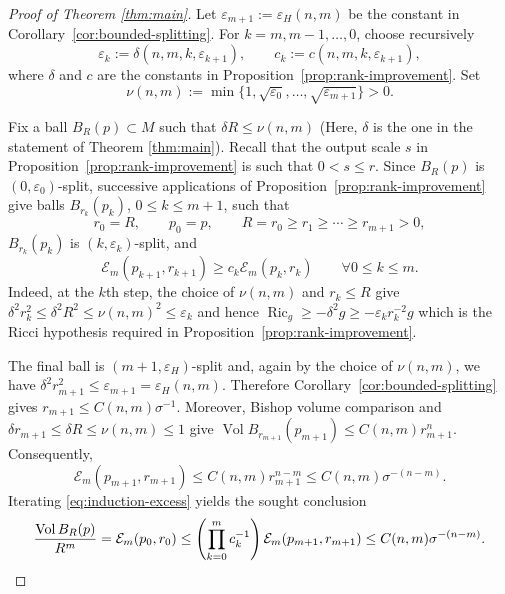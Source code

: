 \documentclass[11pt]{amsart}
\theoremstyle{definition}
\theoremstyle{remark}
\newtheorem{remark}[theorem]{Remark}
\DeclareMathOperator{\Ric}{Ric}
\DeclareMathOperator{\Vol}{Vol}
\newcommand{\R}{\mathbb R}
\newcommand{\eps}{\varepsilon}
\newcommand{\Cint}{\mathcal C}
\newcommand{\Ex}{\mathcal E}
\begin{document}
\begin{proof}[Proof of Theorem \ref{thm:main}]
Let $\eps_{m+1}:=\eps_H(n,m)$ be the constant in
Corollary~\ref{cor:bounded-splitting}. For
$k=m,m-1,\ldots,0$, choose recursively
\[
 \eps_k:=\delta(n,m,k,\eps_{k+1}),
 \qquad
 c_k:=c(n,m,k,\eps_{k+1}),
\]
where $\delta$ and $c$ are the constants in
Proposition~\ref{prop:rank-improvement}. Set
\[
 \nu(n,m):=\min\{1,\sqrt{\eps_0},\ldots,\sqrt{\eps_{m+1}}\}>0.
\]

Fix a ball $B_R(p)\subset M$ such that $\delta R\leq\nu(n,m)$ (Here, $\delta$ is the one in the statement of Theorem \ref{thm:main}).
Recall that the output scale $s$ in
Proposition~\ref{prop:rank-improvement} is such that $0<s\leq r$. Since $B_R(p)$ is
$(0,\eps_0)$-split, successive applications of Proposition~\ref{prop:rank-improvement} give
balls $B_{r_k}(p_k)$, $0\leq k\leq m+1$, such that
\[
 r_0=R,\qquad p_0=p,
 \qquad
 R=r_0\geq r_1\geq\cdots\geq r_{m+1}>0,
\]
$B_{r_k}(p_k)$ is $(k,\eps_k)$-split, and
\begin{equation}\label{eq:induction-excess}
 \Ex_m(p_{k+1},r_{k+1})
 \geq c_k\Ex_m(p_k,r_k)
 \qquad \forall 0\leq k\leq m.
\end{equation}
Indeed, at the $k$th step, the choice of $\nu(n,m)$ and $r_k\leq R$ give $
 \delta^2r_k^2\leq\delta^2R^2
 \leq\nu(n,m)^2\leq\eps_k$ 
and hence $
 \Ric_g\geq-\delta^2g\geq-\eps_k r_k^{-2}g$
which is the Ricci hypothesis required in
Proposition~\ref{prop:rank-improvement}.

The final ball is $(m+1,\eps_H)$-split and, again by the choice of
$\nu(n,m)$, we have  $\delta^2r_{m+1}^2\leq\eps_{m+1}=\eps_H(n,m)$.
Therefore Corollary~\ref{cor:bounded-splitting} gives $
 r_{m+1}\leq C(n,m)\sigma^{-1}$. 
Moreover, Bishop volume comparison and
$\delta r_{m+1}\leq\delta R\leq\nu(n,m)\leq 1$ give $
 \Vol B_{r_{m+1}}(p_{m+1})
 \leq C(n,m)r_{m+1}^n$.
Consequently,
\[
 \Ex_m(p_{m+1},r_{m+1})
 \leq C(n,m)r_{m+1}^{n-m}
 \leq C(n,m)\sigma^{-(n-m)}.
\]
Iterating \eqref{eq:induction-excess} yields the sought conclusion
\[
 \frac{\Vol B_R(p)}{R^m}
 =\Ex_m(p_0,r_0)
 \leq\left(\prod_{k=0}^{m}c_k^{-1}\right)
       \Ex_m(p_{m+1},r_{m+1})
 \leq C(n,m)\sigma^{-(n-m)}. \qedhere
\]
\end{proof}
\end{document}
